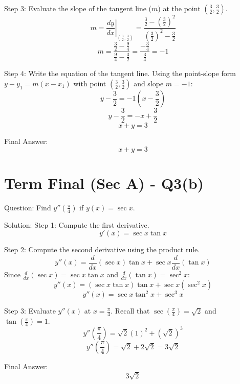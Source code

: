 \documentclass{article}
\begin{document}
Step 3: Evaluate the slope of the tangent line ($m$) at the point $\left(\frac{3}{2}, \frac{3}{2}\right)$.
\[
m = \left. \frac{dy}{dx} \right|_{\left(\frac{3}{2}, \frac{3}{2}\right)} = \frac{\frac{3}{2} - \left(\frac{3}{2}\right)^2}{\left(\frac{3}{2}\right)^2 - \frac{3}{2}}
\]
\[
m = \frac{\frac{3}{2} - \frac{9}{4}}{\frac{9}{4} - \frac{3}{2}} = \frac{-\frac{3}{4}}{\frac{3}{4}} = -1
\]

Step 4: Write the equation of the tangent line.
Using the point-slope form $y - y_1 = m(x - x_1)$ with point $\left(\frac{3}{2}, \frac{3}{2}\right)$ and slope $m = -1$:
\[
y - \frac{3}{2} = -1 \left(x - \frac{3}{2}\right)
\]
\[
y - \frac{3}{2} = -x + \frac{3}{2}
\]
\[
x + y = 3
\]

Final Answer:
\[
\boxed{x + y = 3}
\]

\section*{Term Final (Sec A) - Q3(b)}
Question:
Find $y''\left(\frac{\pi}{4}\right)$ if $y(x) = \sec x$.

Solution:
Step 1: Compute the first derivative.
\[
y'(x) = \sec x \tan x
\]

Step 2: Compute the second derivative using the product rule.
\[
y''(x) = \frac{d}{dx}(\sec x) \tan x + \sec x \frac{d}{dx}(\tan x)
\]
Since $\frac{d}{dx}(\sec x) = \sec x \tan x$ and $\frac{d}{dx}(\tan x) = \sec^2 x$:
\[
y''(x) = (\sec x \tan x) \tan x + \sec x (\sec^2 x)
\]
\[
y''(x) = \sec x \tan^2 x + \sec^3 x
\]

Step 3: Evaluate $y''(x)$ at $x = \frac{\pi}{4}$.
Recall that $\sec\left(\frac{\pi}{4}\right) = \sqrt{2}$ and $\tan\left(\frac{\pi}{4}\right) = 1$.
\[
y''\left(\frac{\pi}{4}\right) = \sqrt{2} (1)^2 + (\sqrt{2})^3
\]
\[
y''\left(\frac{\pi}{4}\right) = \sqrt{2} + 2\sqrt{2} = 3\sqrt{2}
\]

Final Answer:
\[
\boxed{3\sqrt{2}}
\]
\end{document}
